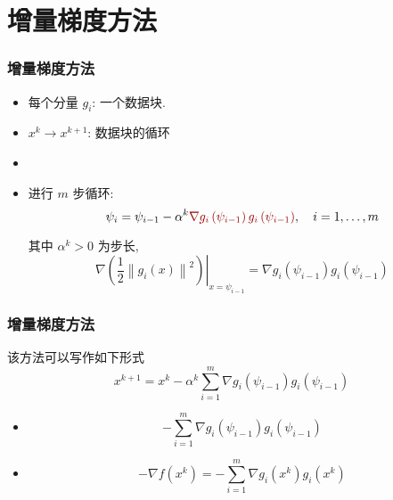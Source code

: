 \documentclass[11pt]{beamer}
\begin{document}
\section{增量梯度方法}

%

\begin{frame}
\frametitle{\secno 增量梯度方法}

\begin{itemize}
  \item 每个分量  $g_{i}$: 一个数据块.


 \item   $x^k\rightarrow x^{k+1}$: 数据块的循环

 \item {}

 \item
进行 $m$ 步循环:
$$
\psi_{i}=\psi_{i - 1}-\alpha^{k}
 \dred{\nabla g_{i}\left(\psi_{i-1}\right) g_{i}\left(\psi_{i-1}\right)}, \quad i=1, \ldots, m
$$

其中 $\alpha^{k}>0$ 为步长,
$$
\left.\nabla\left(\frac{1}{2}\left\|g_{i}(x)\right\|^{2}\right)\right|_{x=\psi_{i - 1}}=\nabla g_{i}\left(\psi_{i-1}\right) g_{i}\left(\psi_{i-1}\right)
$$


\end{itemize}
\end{frame}

\begin{frame}
\frametitle{增量梯度方法}
该方法可以写作如下形式
\begin{equation}
x^{k+1}=x^{k}-\alpha^{k} \sum_{i=1}^{m} \nabla g_{i}\left(\psi_{i-1}\right) g_{i}\left(\psi_{i-1}\right)
\end{equation}


\begin{itemize}
  \item
{}
$$
-\sum_{i=1}^{m} \nabla g_{i}\left(\psi_{i-1}\right) g_{i}\left(\psi_{i-1}\right)
$$

\item  {}
$$
-\nabla f\left(x^{k}\right)=-\sum_{i=1}^{m} \nabla g_{i}\left(x^{k}\right) g_{i}\left(x^{k}\right)
$$
\end{itemize}
\end{frame}
\end{document}
